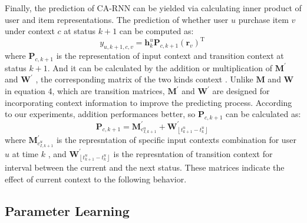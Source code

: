 \documentclass{sig-alternate}
\begin{document}
Finally, the prediction of CA-RNN can be yielded via calculating inner product of user and item representations. The prediction of whether user $u$ purchase item $v$  under context $c$ at status $k+1$ can be computed as:
\begin{equation}
y_{u, k+1, c, v} = \mathbf{h}_{k}^{u}\mathbf{P}_{c, k+1}(\mathbf{r}_{v})^ \mathrm{ T }~
\end{equation}
where $\mathbf{P}_{c, k+1}$ is the representation of input context and transition context at status $k+1$. And it can be calculated by the addition or multiplication of $\mathbf{M}^{'}$ and $\mathbf{W}^{'}$ , the corresponding matrix of the two kinds context . Unlike $\mathbf{M}$ and $\mathbf{W}$ in equation 4, which are transition matrices, $\mathbf{M}^{'}$ and $\mathbf{W}^{'}$ are designed for incorporating context information to improve the predicting process. According to our experiments, addition performances better, so $\mathbf{P}_{c, k+1}$ can be calculated as:
\begin{equation}   \label{eqPadd}
\mathbf{P}_{c, k+1}=\mathbf{M}_{c_{I,k+1}^{u}}^{'} + \mathbf{W}_{\left \lfloor t_{k+1}^{u} - t_{k}^{u}\right \rfloor}^{'}~
\end{equation}
where $\mathbf{M}_{c_{I,k+1}^{u}}^{'}$ is the represntation of specific input contexts combination for user $u$ at time $k$ , and $\mathbf{W}_{\left \lfloor t_{k+1}^{u} - t_{k}^{u}\right \rfloor}^{'}$ is the represntation of transition context for interval between the current and the next status. These matrices indicate the effect of current context to the following behavior.





\subsection{Parameter Learning}
\end{document}
